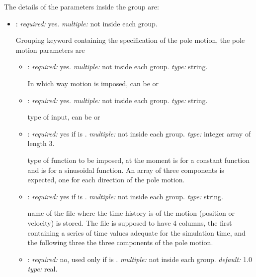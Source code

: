 The details of the parameters inside the  group are:
\begin{itemize}
\item {}: \textit{required:} yes. \textit{multiple:} 
not inside each  group.

Grouping keyword containing the specification of the pole motion, 
the pole motion parameters are

	\begin{itemize}
	\item {}: \textit{required:} yes. \textit{multiple:} 
    not inside each  group. \textit{type:} string.
    
    In which way motion is imposed, can be  or 
    
    \item {}: \textit{required:} yes. \textit{multiple:} 
    not inside each  group. \textit{type:} string.
    
    type of input, can be  or 
    
    \item {}: \textit{required:} yes if  
    is . \textit{multiple:} not inside each  
    group. \textit{type:} integer array of length 3.
    
    type of function to be imposed, at the moment  is for a constant 
    function and  is for a sinusoidal function. An array of three 
    components is expected, one for each direction of the pole motion.    

        \item {}: \textit{required:} yes if  
        is . \textit{multiple:} not inside each  
        group. \textit{type:} string.
        
        name of the file where the time history is of the motion 
        (position or velocity) is stored. The file is supposed to have 
        4 columns, the first containing a series of time values adequate 
        for the simulation time, and the following three the three components 
        of the pole motion. 
        
    \item {}: \textit{required:} no, used only if      
    is . \textit{multiple:} not inside each  group. 
    \textit{default:} 1.0 \textit{type:} real.
    

\end{itemize}
\end{itemize}
